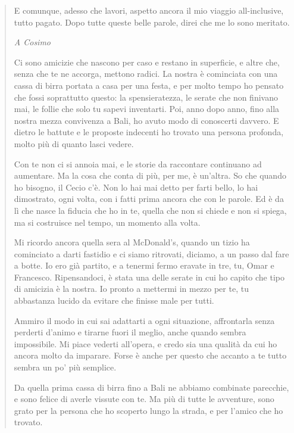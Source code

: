 \begin{quote}
E comunque, adesso che lavori, aspetto ancora il mio viaggio all-inclusive, tutto pagato. Dopo tutte queste belle parole, direi che me lo sono meritato.\par

\clearpage
\vspace{5mm}
\textit{A Cosimo}\par
\vspace{2mm}
Ci sono amicizie che nascono per caso e restano in superficie, e altre che, senza che te ne accorga, mettono radici. La nostra è cominciata con una cassa di birra portata a casa per una festa, e per molto tempo ho pensato che fossi soprattutto questo: la spensieratezza, le serate che non finivano mai, le follie che solo tu sapevi inventarti. Poi, anno dopo anno, fino alla nostra mezza convivenza a Bali, ho avuto modo di conoscerti davvero. E dietro le battute e le proposte indecenti ho trovato una persona profonda, molto più di quanto lasci vedere.\par

Con te non ci si annoia mai, e le storie da raccontare continuano ad aumentare. Ma la cosa che conta di più, per me, è un'altra. So che quando ho bisogno, il Cecio c'è. Non lo hai mai detto per farti bello, lo hai dimostrato, ogni volta, con i fatti prima ancora che con le parole. Ed è da lì che nasce la fiducia che ho in te, quella che non si chiede e non si spiega, ma si costruisce nel tempo, un momento alla volta.\par

Mi ricordo ancora quella sera al McDonald's, quando un tizio ha cominciato a darti fastidio e ci siamo ritrovati, diciamo, a un passo dal fare a botte. Io ero già partito, e a tenermi fermo eravate in tre, tu, Omar e Francesco. Ripensandoci, è stata una delle serate in cui ho capito che tipo di amicizia è la nostra. Io pronto a mettermi in mezzo per te, tu abbastanza lucido da evitare che finisse male per tutti.\par

Ammiro il modo in cui sai adattarti a ogni situazione, affrontarla senza perderti d'animo e tirarne fuori il meglio, anche quando sembra impossibile. Mi piace vederti all'opera, e credo sia una qualità da cui ho ancora molto da imparare. Forse è anche per questo che accanto a te tutto sembra un po' più semplice.\par

Da quella prima cassa di birra fino a Bali ne abbiamo combinate parecchie, e sono felice di averle vissute con te. Ma più di tutte le avventure, sono grato per la persona che ho scoperto lungo la strada, e per l'amico che ho trovato.\par


\end{quote}
